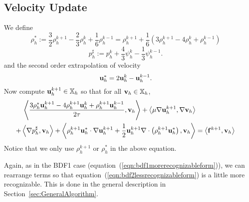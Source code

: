 \documentclass[letterpaper]{erdc}
\begin{document}
\subsection{Velocity Update}
We define
\begin{equation}
  \rho_h^{*} := \frac{3}{2}\rho_h^{k+1} - \frac{2}{3}\rho_h^{k} + \frac{1}{6}\rho_h^{k-1} = \rho_h^{k+1} + \frac{1}{6}\left(3\rho_h^{k+1} -4\rho_h^{k} + \rho_h^{k-1} \right)
\end{equation}
\begin{equation}
  p_h^{\sharp} := p_h^{k} + \frac{4}{3}\psi_h^{k} - \frac{1}{3}\psi_h^{k-1}.
\end{equation}
and the second order extrapolation of velocity
\begin{equation}\label{eq:velocityextrapolation_uniformtimestep}
  \textbf{u}^{*}_h = 2\textbf{u}_h^{k}  - \textbf{u}_h^{k-1}.
\end{equation}
Now compute $\textbf{u}_h^{k+1}\in\mathbb{X}_h$ so that for all $\textbf{v}_h\in\mathbb{X}_h$,
\begin{equation}\label{eqn:bdf2lessrecognizableform}
  \begin{split}
    \left\langle \frac{3\rho_h^{*}\textbf{u}_h^{k+1} - 4\rho_h^{k+1}\textbf{u}_h^{k} + \rho_h^{k+1}\textbf{u}_h^{k-1}}{2\tau}, \textbf{v}_h \right\rangle  + \left\langle \mu\nabla\textbf{u}_h^{k+1}, \nabla\textbf{v}_h \right\rangle &\\
   + \left\langle \nabla p_h^{\sharp}, \textbf{v}_h \right\rangle + \left\langle \rho_h^{k+1}\textbf{u}_h^{*}\cdot\nabla\textbf{u}_h^{k+1} + \frac{1}{2}\textbf{u}_h^{k+1}\nabla\cdot\left( \rho_h^{k+1}\textbf{u}_h^{*} \right), \textbf{v}_h \right\rangle &= \left\langle \mathbf{f}^{k+1}, \textbf{v}_h \right\rangle
  \end{split}
\end{equation}
Notice that we only use $\rho_h^{k+1}$ or $\rho_h^{*}$ in the above equation.

\begin{remark}
Again, as in the BDF1 case (equation~(\ref{eqn:bdf1morerecognizableform})), we can rearrange terms so that equation~(\ref{eqn:bdf2lessrecognizableform}) is a little more recognizable.  This is done in the general description in Section~\ref{sec:GeneralAlgorithm}.
\end{remark}
\end{document}
